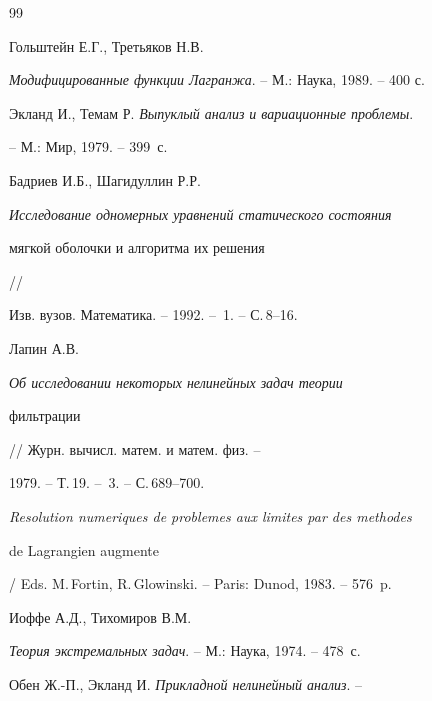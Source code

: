 \begin{thebibliography}{99}







Гольштейн Е.Г., Третьяков Н.В. 


{\em Модифицированные функции Лагранжа}. -- М.: Наука, 1989. -- 400 с.







Экланд И., Темам Р. {\em Выпуклый анализ и вариационные проблемы}.


-- М.: Мир, 1979. -- 399~с.







Бадриев И.Б., Шагидуллин Р.Р.


{\em Исследование одномерных уравнений статического состояния


мягкой оболочки и алгоритма их решения} // 


Изв. вузов. Математика. -- 1992. -- \No\,1. -- С.\,8--16. 







Лапин А.В. {\em Об исследовании некоторых нелинейных задач теории 


фильтрации} // Журн. вычисл. матем. и матем. физ. --


1979. -- Т.\,19. -- \No\,3. -- С.\,689--700.







{\em Resolution numeriques de problemes aux limites par des methodes


de Lagrangien augmente}


/ Eds. M.\,Fortin, R.\,Glowinski. -- Paris: Dunod, 1983. -- 576~p.







Иоффе А.Д., Тихомиров В.М.


{\em Теория экстремальных задач}. -- М.: Наука, 1974. -- 478~с.







Обен Ж.-П., Экланд И. {\em Прикладной нелинейный анализ}. --



\end{thebibliography}
